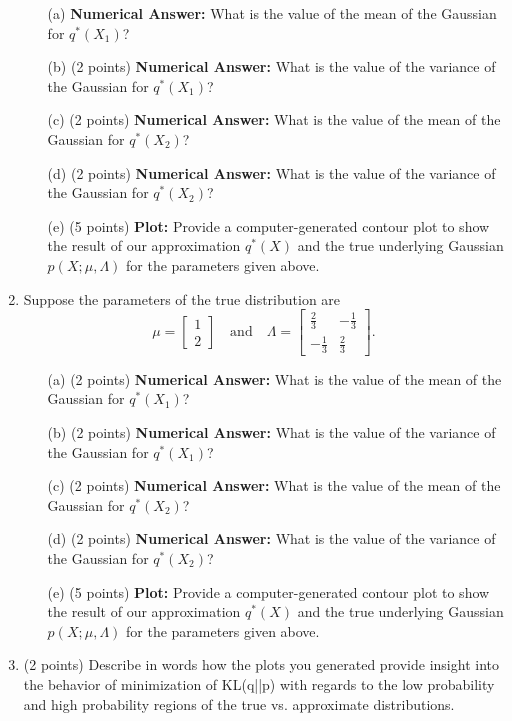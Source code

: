 \documentclass[a3paper,12pt]{extarticle} %
\begin{document}
\begin{enumerate}
        \begin{enumerate}
            \item[(a)] \textbf{Numerical Answer:} What is the value of the mean of the Gaussian for \( q^*(X_1) \)?
            \item[(b)] (2 points) \textbf{Numerical Answer:} What is the value of the variance of the Gaussian for \( q^*(X_1) \)?
            \item[(c)] (2 points) \textbf{Numerical Answer:} What is the value of the mean of the Gaussian for \( q^*(X_2) \)?
            \item[(d)] (2 points) \textbf{Numerical Answer:} What is the value of the variance of the Gaussian for \( q^*(X_2) \)?
            \item[(e)] (5 points) \textbf{Plot:} Provide a computer-generated contour plot to show the result of our approximation \( q^*(X) \) and the true underlying Gaussian \( p(X; \mu, \Lambda) \) for the parameters given above.
        \end{enumerate}
    \item Suppose the parameters of the true distribution are 
    \[
    \mu = 
    \begin{bmatrix}
    1 \\
    2
    \end{bmatrix}
    \quad \text{and} \quad
    \Lambda = 
    \begin{bmatrix}
    \frac{2}{3} & -\frac{1}{3} \\
    -\frac{1}{3} & \frac{2}{3}
    \end{bmatrix}.
    \]
    
        \begin{enumerate}
            \item[(a)] (2 points) \textbf{Numerical Answer:} What is the value of the mean of the Gaussian for \( q^*(X_1) \)?
            \item[(b)] (2 points) \textbf{Numerical Answer:} What is the value of the variance of the Gaussian for \( q^*(X_1) \)?
            \item[(c)] (2 points) \textbf{Numerical Answer:} What is the value of the mean of the Gaussian for \( q^*(X_2) \)?
            \item[(d)] (2 points) \textbf{Numerical Answer:} What is the value of the variance of the Gaussian for \( q^*(X_2) \)?
            \item[(e)] (5 points) \textbf{Plot:} Provide a computer-generated contour plot to show the result of our approximation \( q^*(X) \) and the true underlying Gaussian \( p(X; \mu, \Lambda) \) for the parameters given above.
        \end{enumerate}
    \item (2 points) Describe in words how the plots you generated provide insight into the behavior of minimization of
    KL(q||p) with regards to the low probability and high probability regions of the true vs. approximate distributions.


\end{enumerate}
\end{document}
